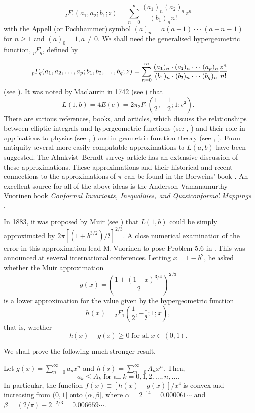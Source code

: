 \documentclass[final]{siamltex}
\begin{document}
\[
{}_{2}F_{1}(a_1,a_2;b_1;z) = \sum _{n=0}^{\infty }\frac{ (a_1)_n (a_2)_n}{(b_1)_n n!} z^n
\]
with the Appell (or Pochhammer) symbol $(a)_{n}=a(a+1)\cdot \cdot \cdot (a+n-1)$ for $n\geq 1$ and $(a)_{0}=1, a \neq 0$.
We shall need the generalized hypergeometric function, ${}_{p}F_{q}$, defined by

\[
\,{\ }_{p}F_{q}(a_{1},a_{2},\ldots,a_{p};b_{1},b_{2},\ldots, b_{q};z)=\sum_{n=0}^{%
\infty }\frac{(a_{1})_{n}\cdot (a_{2})_{n}\cdot \cdot \cdot (a_{p})_{n}}{%
(b_{1})_{n}\cdot (b_{2})_{n}\cdot \cdot \cdot (b_{q})_{n}}\frac{z^{n}}{n!} 
\]
(see \cite[p. 73]{R}).  It was noted by Maclaurin in 1742 (see \cite{AB}) that
$$L(1,b) = 4 E(e) = 2\pi {}_{2}F_{1}(\mbox{$\frac{1}{2}$},-\mbox{$\frac{1}{2}$};1;e^2).$$
There are various references, books, and articles, which discuss the relationships between elliptic integrals and 
hypergeometric functions (see \cite{AVV}, \cite{C}) and their role in applications to physics (see \cite{L}, \cite{G}) 
and in geometric function theory  (see \cite{H}, \cite{AVV}).  From antiquity several more easily computable 
approximations to $L(a,b)$ have been suggested.  The Almkvist--Berndt survey article \cite{AB} has an extensive 
discussion of these approximations.  These approximations and their historical and recent connections to the 
approximations of $\pi$ can be found in the Borweins' book \cite{BB}.  An excellent source for all of the above 
ideas is the Anderson--Vamanamurthy--Vuorinen book {\em Conformal Invariants, Inequalities, and Quasiconformal Mappings} \cite{AVV}.

In 1883, it was proposed by Muir  (see \cite{AB}) that $L(1,b)$ could be simply approximated by 
$2\pi [(1+b^{3/2})/2]^{2/3}$. A close numerical examination of the error in this
approximation lead M. Vuorinen to pose Problem 5.6 in  \cite{V}. This was announced at
several international conferences. Letting $x=1-b^{2}$, he asked whether the
Muir approximation 
\[
g(x)=\left( \frac{1+(1-x)^{3/4}}{2}\right) ^{2/3} 
\]
is a lower approximation for the value given by the hypergeometric function 
\[
h(x)={}_{2}F_{1}\left( \mbox{$\frac{1}{2}$},-\mbox{$\frac{1}{2}$};1;x\right)
, 
\]
that is, whether 
\[
h(x)-g(x)\geq 0\;\mbox{for all}\;x\in (0,1).  
\]

We shall prove the following much stronger result.

\begin{theorem}\label{strong}
Let $g(x)=\sum_{n=0}^{\infty
}a_{n}x^{n}$ and $h(x)=\sum_{n=0}^{\infty }A_{n}x^{n}$. Then, 
\begin{equation}
a_{k}\leq A_{k}\;\mbox{for all}\;k=0,1,2,\ldots,n,\ldots.  \label{eq2}
\end{equation}
In particular, the function  $f(x) \equiv [h(x)-g(x)]/x^{4}$ is convex and increasing from 
$(0,1]$ onto $(\alpha,\beta]$, where $\alpha = 2^{-14} = 0.000061\cdots$ and 
$\beta = ({2}/{\pi })-{2^{-2/3}} = 0.006659\cdots$.
\end{theorem}
\end{document}
